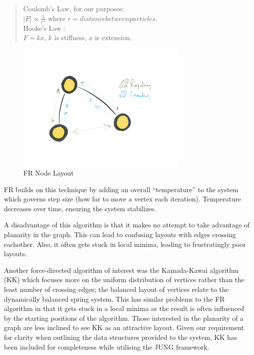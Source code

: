 \documentclass[11pt, a4paper]{report}
\begin{document}
\begin{quote}

Coulomb’s Law, for our purposes: \\
$|F| \propto \frac{1}{r^2}$ where $r = distance between particles$.\\
Hooke’s Law : \\
$F = k x$, $k$ is stiffness, $x$ is extension.

\end{quote}

\begin{figure}[h]
        \centering
        \includegraphics[width=0.75\textwidth]{images/final/frnodes.png}
        \caption{FR Node Layout}
\end{figure}

FR builds on this technique by adding an overall “temperature” to the system which governs step size (how far to move a vertex each iteration). Temperature decreases over time, ensuring the system stabilizes.

A disadvantage of this algorithm is that it makes no attempt to take advantage of planarity in the graph. This can lead to confusing layouts with edges crossing eachother. Also, it often gets stuck in local minima, leading to frustratingly poor layouts.

Another force-directed algorithm of interest was the Kamada-Kawai algorithm (KK) which focuses more on the uniform distribution of vertices rather than the least number of crossing edges; the balanced layout of vertices relate to the dynamically balanced spring system. This has similar problems to the FR algorithm in that it gets stuck in a local minima as the result is often influenced by the starting positions of the algorithm. Those interested in the planarity of a graph are less inclined to see KK as an attractive layout. Given our requirement for clarity when outlining the data structures provided to the system, KK has been included for completeness while utilising the JUNG framework. 
\end{document}

